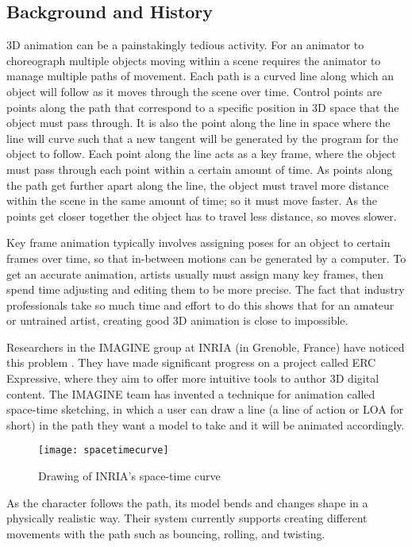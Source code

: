 \subsection{Background and History}
3D animation can be a painstakingly tedious activity. For an animator to choreograph multiple objects moving within a scene requires the animator to manage multiple paths of movement. Each path is a curved line along which an object will follow as it moves through the scene over time. Control points are points along the path that correspond to a specific position in 3D space that the object must pass through. It is also the point along the line in space where the line will curve such that a new tangent will be generated by the program for the object to follow. Each point along the line acts as a key frame, where the object must pass through each point within a certain amount of time. As points along the path get further apart along the line, the object must travel more distance within the scene in the same amount of time; so it must move faster. As the points get closer together the object has to travel less distance, so moves slower.

Key frame animation typically involves assigning poses for an object to certain frames over time, so that in-between motions can be generated by a computer. To get an accurate animation, artists usually must assign many key frames, then spend time adjusting and editing them to be more precise. The fact that industry professionals take so much time and effort to do this shows that for an amateur or untrained artist, creating good 3D animation is close to impossible.

Researchers in the IMAGINE group at INRIA (in Grenoble, France) have noticed this problem \cite{hal}. They have made significant progress on a project called ERC Expressive, where they aim to offer more intuitive tools to author 3D digital content. The IMAGINE team has invented a technique for animation called space-time sketching, in which a user can draw a line (a line of action or LOA for short) in the path they want a model to take and it will be animated accordingly.\\

\begin{figure}[H]
\centering
\texttt{[image: spacetimecurve]}
\caption{Drawing of INRIA's space-time curve}
\label{fig:spaceTimeCurve}
\end{figure}

As the character follows the path, its model bends and changes shape in a physically realistic way. Their system currently supports creating different movements with the path such as bouncing, rolling, and twisting.


